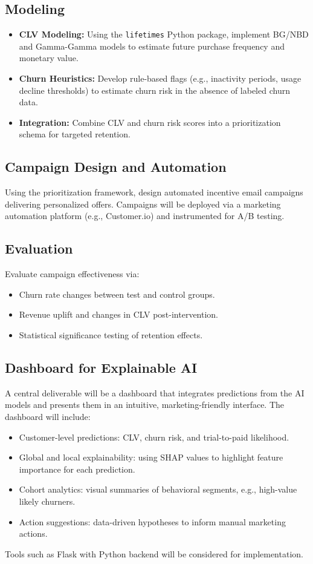 \documentclass[12pt,a4paper]{article}
\begin{document}
\subsection{Modeling}
\begin{itemize}[leftmargin=*]
    \item \textbf{CLV Modeling:} Using the \texttt{lifetimes} Python package, implement BG/NBD and Gamma-Gamma models to estimate future purchase frequency and monetary value.
    \item \textbf{Churn Heuristics:} Develop rule-based flags (e.g., inactivity periods, usage decline thresholds) to estimate churn risk in the absence of labeled churn data.
    \item \textbf{Integration:} Combine CLV and churn risk scores into a prioritization schema for targeted retention.
\end{itemize}

\subsection{Campaign Design and Automation}
Using the prioritization framework, design automated incentive email campaigns delivering personalized offers. Campaigns will be deployed via a marketing automation platform (e.g., Customer.io) and instrumented for A/B testing.

\subsection{Evaluation}
Evaluate campaign effectiveness via:
\begin{itemize}[leftmargin=*]
    \item Churn rate changes between test and control groups.
    \item Revenue uplift and changes in CLV post-intervention.
    \item Statistical significance testing of retention effects.
\end{itemize}

\subsection{Dashboard for Explainable AI}
A central deliverable will be a dashboard that integrates predictions from the AI models and presents them in an intuitive, marketing-friendly interface. The dashboard will include:
\begin{itemize}[leftmargin=*]
    \item Customer-level predictions: CLV, churn risk, and trial-to-paid likelihood.
    \item Global and local explainability: using SHAP values to highlight feature importance for each prediction.
    \item Cohort analytics: visual summaries of behavioral segments, e.g., high-value likely churners.
    \item Action suggestions: data-driven hypotheses to inform manual marketing actions.
\end{itemize}
Tools such as Flask with Python backend will be considered for implementation.
\end{document}
